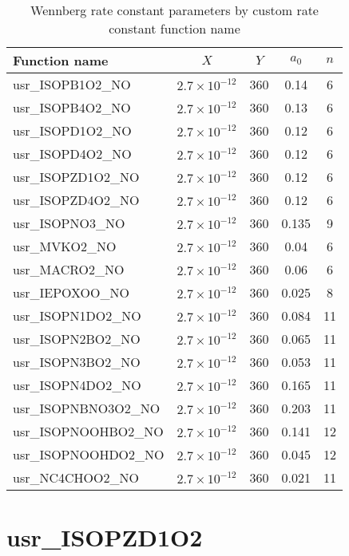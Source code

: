 \documentclass[titlepage]{article}
\begin{document}
\begin{table}
\centering
\caption{Wennberg  rate constant parameters by custom rate constant function name}
\label{tab:wennberg}
\begin{tabular}{l c c c c}
Function name & $X$ & $Y$ & $a_0$ & $n$ \\
\hline
usr\_ISOPB1O2\_NO   & $2.7 \times 10^{-12}$ & 360 & 0.14   & 6 \\
usr\_ISOPB4O2\_NO   & $2.7 \times 10^{-12}$ & 360 & 0.13   & 6 \\
usr\_ISOPD1O2\_NO   & $2.7 \times 10^{-12}$ & 360 & 0.12   & 6 \\
usr\_ISOPD4O2\_NO   & $2.7 \times 10^{-12}$ & 360 & 0.12   & 6 \\
usr\_ISOPZD1O2\_NO & $2.7 \times 10^{-12}$ & 360 & 0.12   & 6 \\
usr\_ISOPZD4O2\_NO & $2.7 \times 10^{-12}$ & 360 & 0.12   & 6 \\
usr\_ISOPNO3\_NO     & $2.7 \times 10^{-12}$ & 360 & 0.135 & 9 \\
usr\_MVKO2\_NO        & $2.7 \times 10^{-12}$ & 360 & 0.04   & 6 \\
usr\_MACRO2\_NO      & $2.7 \times 10^{-12}$ & 360 & 0.06  & 6 \\
usr\_IEPOXOO\_NO     & $2.7 \times 10^{-12}$ & 360 & 0.025 & 8 \\
usr\_ISOPN1DO2\_NO & $2.7 \times 10^{-12}$ & 360 & 0.084 & 11 \\
usr\_ISOPN2BO2\_NO & $2.7 \times 10^{-12}$ & 360 & 0.065 & 11 \\
usr\_ISOPN3BO2\_NO & $2.7 \times 10^{-12}$ & 360 & 0.053 & 11 \\
usr\_ISOPN4DO2\_NO & $2.7 \times 10^{-12}$ & 360 & 0.165 & 11 \\
usr\_ISOPNBNO3O2\_NO & $2.7 \times 10^{-12}$ & 360 & 0.203 & 11 \\
usr\_ISOPNOOHBO2\_NO & $2.7 \times 10^{-12}$ & 360 & 0.141 & 12 \\
usr\_ISOPNOOHDO2\_NO & $2.7 \times 10^{-12}$ & 360 & 0.045 & 12 \\
usr\_NC4CHOO2\_NO & $2.7 \times 10^{-12}$ & 360 & 0.021 & 11 \\
\hline
\end{tabular}
\end{table}


\section{usr\_ISOPZD1O2}
\end{document}
